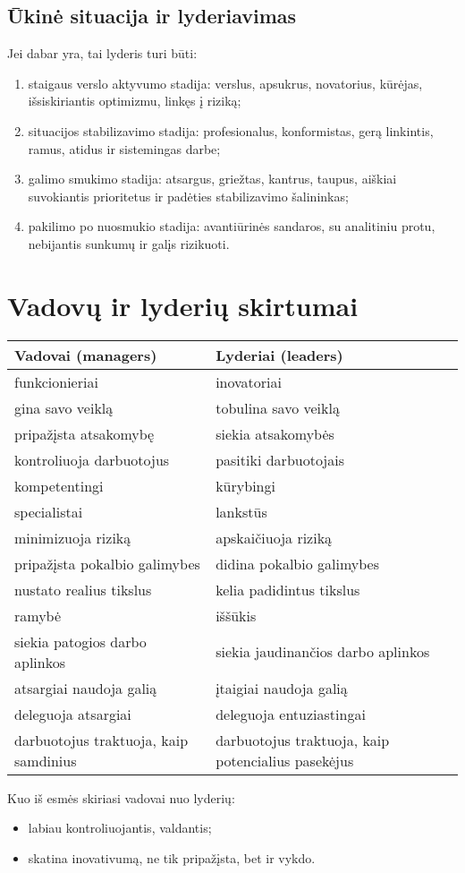 \subsection{Ūkinė situacija ir lyderiavimas}

Jei dabar yra, tai lyderis turi būti:
\begin{enumerate}
  \item staigaus verslo aktyvumo stadija: verslus, apsukrus, novatorius,
    kūrėjas, išsiskiriantis optimizmu, linkęs į riziką;
  \item situacijos stabilizavimo stadija: profesionalus, konformistas,
    gerą linkintis, ramus, atidus ir sistemingas darbe;
  \item galimo smukimo stadija: atsargus, griežtas, kantrus, taupus,
    aiškiai suvokiantis prioritetus ir padėties stabilizavimo šalininkas;
  \item pakilimo po nuosmukio stadija: avantiūrinės sandaros, su
    analitiniu protu, nebijantis sunkumų ir galįs rizikuoti.
\end{enumerate}

\section{Vadovų ir lyderių skirtumai}

\begin{tabularx}{\textwidth}[]{X | X}
  Vadovai (managers) & Lyderiai (leaders) \\
  \hline
  funkcionieriai & inovatoriai \\
  gina savo veiklą & tobulina savo veiklą \\
  pripažįsta atsakomybę & siekia atsakomybės \\
  kontroliuoja darbuotojus & pasitiki darbuotojais \\
  kompetentingi & kūrybingi \\
  specialistai & lankstūs \\
  minimizuoja riziką & apskaičiuoja riziką \\
  pripažįsta pokalbio galimybes & didina pokalbio galimybes \\
  nustato realius tikslus & kelia padidintus tikslus \\
  ramybė & iššūkis \\
  siekia patogios darbo aplinkos & siekia jaudinančios darbo aplinkos \\
  atsargiai naudoja galią & įtaigiai naudoja galią \\
  deleguoja atsargiai & deleguoja entuziastingai \\
  darbuotojus traktuoja, kaip samdinius & darbuotojus traktuoja, kaip
  potencialius pasekėjus
\end{tabularx}


Kuo iš esmės skiriasi vadovai nuo lyderių:
\begin{itemize}
  \item labiau kontroliuojantis, valdantis;
  \item skatina inovativumą, ne tik pripažįsta, bet ir vykdo.
\end{itemize}
